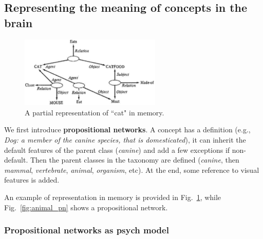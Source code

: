 \subsection{Representing the meaning of concepts in the brain}

\begin{figure}
  \centering
  \includegraphics[width=0.6\textwidth]{images/cat_pn.png}
  \caption{A partial representation of ``cat" in memory.}
  \label{fig:cat_pn}
\end{figure}

We first introduce \textbf{propositional networks}.
A concept has a definition (e.g., \textit{Dog: a member of the canine species, that is domesticated}), it can inherit the default features of the parent class (\textit{canine}) and add a few exceptions if non-default. 
Then the parent classes in the taxonomy are defined (\textit{canine}, then \textit{mammal}, \textit{vertebrate}, \textit{animal}, \textit{organism}, etc).
At the end, some reference to visual features is added.

An example of representation in memory is provided in Fig.~\ref{fig:cat_pn}, while Fig.~\ref{fig:animal_pn} shows a propositional network.

\subsubsection{Propositional networks as psych model}

